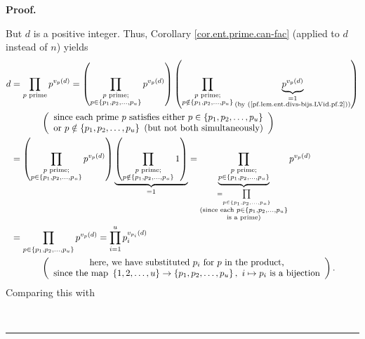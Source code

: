\documentclass[numbers=enddot,12pt,final,onecolumn,notitlepage]{scrartcl}%
\numberwithin{exer}{subsection}
\theoremstyle{definition}
\newenvironment{fineprint}{\begin{small}}{\end{small}}
\newenvironment{proof}[1][Proof]{\noindent\textbf{#1.} }{\ \rule{0.5em}{0.5em}}
\let\prodnonlimits\prod
\renewcommand{\prod}{\prodnonlimits\limits}
\begin{document}
\begin{proof}
\begin{fineprint}
But $d$ is a positive integer. Thus, Corollary \ref{cor.ent.prime.can-fac}
(applied to $d$ instead of $n$) yields
\begin{align*}
d  &  =\prod_{p\text{ prime}}p^{v_{p}\left(  d\right)  }=\left(
\prod_{\substack{p\text{ prime;}\\p\in\left\{  p_{1},p_{2},\ldots
,p_{u}\right\}  }}p^{v_{p}\left(  d\right)  }\right)  \left(  \prod
_{\substack{p\text{ prime;}\\p\notin\left\{  p_{1},p_{2},\ldots,p_{u}\right\}
}}\underbrace{p^{v_{p}\left(  d\right)  }}_{\substack{=1\\\text{(by
(\ref{pf.lem.ent.divs-bijs.LVid.pf.2}))}}}\right) \\
&  \ \ \ \ \ \ \ \ \ \ \left(
\begin{array}
[c]{c}%
\text{since each prime }p\text{ satisfies either }p\in\left\{  p_{1}%
,p_{2},\ldots,p_{u}\right\} \\
\text{or }p\notin\left\{  p_{1},p_{2},\ldots,p_{u}\right\}  \text{ (but not
both simultaneously)}%
\end{array}
\right) \\
&  =\left(  \prod_{\substack{p\text{ prime;}\\p\in\left\{  p_{1},p_{2}%
,\ldots,p_{u}\right\}  }}p^{v_{p}\left(  d\right)  }\right)
\underbrace{\left(  \prod_{\substack{p\text{ prime;}\\p\notin\left\{
p_{1},p_{2},\ldots,p_{u}\right\}  }}1\right)  }_{=1}=\underbrace{\prod
_{\substack{p\text{ prime;}\\p\in\left\{  p_{1},p_{2},\ldots,p_{u}\right\}
}}}_{\substack{=\prod_{p\in\left\{  p_{1},p_{2},\ldots,p_{u}\right\}
}\\\text{(since each }p\in\left\{  p_{1},p_{2},\ldots,p_{u}\right\}
\\\text{is a prime)}}}p^{v_{p}\left(  d\right)  }\\
&  =\prod_{p\in\left\{  p_{1},p_{2},\ldots,p_{u}\right\}  }p^{v_{p}\left(
d\right)  }=\prod_{i=1}^{u}p_{i}^{v_{p_{i}}\left(  d\right)  }\\
&  \ \ \ \ \ \ \ \ \ \ \left(
\begin{array}
[c]{c}%
\text{here, we have substituted }p_{i}\text{ for }p\text{ in the product,}\\
\text{since the map }\left\{  1,2,\ldots,u\right\}  \rightarrow\left\{
p_{1},p_{2},\ldots,p_{u}\right\}  ,\ i\mapsto p_{i}\text{ is a bijection}%
\end{array}
\right)  .
\end{align*}
Comparing this with%

\end{fineprint}
\end{proof}
\end{document}
